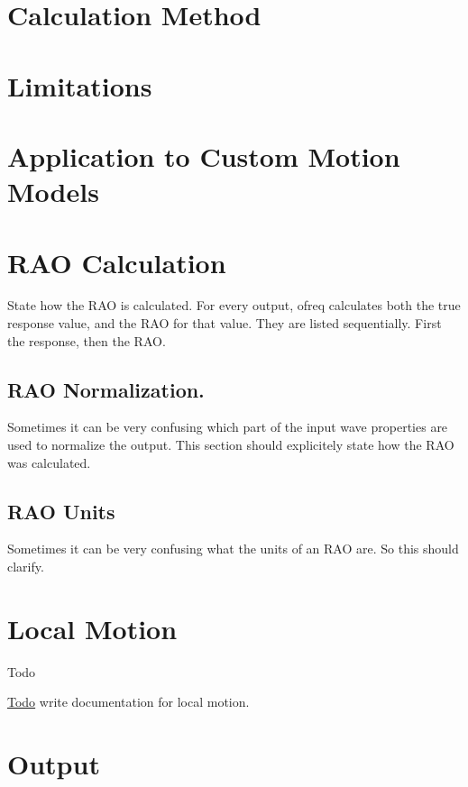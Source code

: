 \section*{Calculation Method}

\section*{Limitations}

\section*{Application to Custom Motion Models}

\section*{R\-A\-O Calculation}

State how the R\-A\-O is calculated. For every output, ofreq calculates both the true response value, and the R\-A\-O for that value. They are listed sequentially. First the response, then the R\-A\-O.

\subsection*{R\-A\-O Normalization.}

Sometimes it can be very confusing which part of the input wave properties are used to normalize the output. This section should explicitely state how the R\-A\-O was calculated.

\subsection*{R\-A\-O Units}

Sometimes it can be very confusing what the units of an R\-A\-O are. So this should clarify. \hypertarget{local_motion}{}\section{Local Motion}\label{local_motion}
\begin{DoxyRefDesc}{Todo}
\item[\hyperlink{todo__todo000020}{Todo}]write documentation for local motion.\end{DoxyRefDesc}


\section*{Output}

